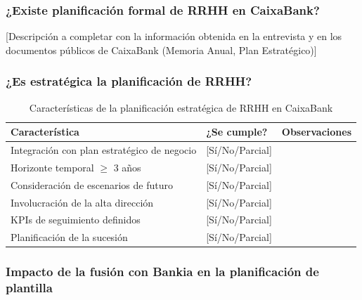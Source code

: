\subsubsection{¿Existe planificación formal de RRHH en CaixaBank?}

[Descripción a completar con la información obtenida en la entrevista
y en los documentos públicos de CaixaBank (Memoria Anual, Plan Estratégico)]

\subsubsection{¿Es estratégica la planificación de RRHH?}


\begin{table}[H]
  \centering
  \small
  \caption{Características de la planificación estratégica de RRHH en CaixaBank}
  \begin{tabularx}{\textwidth}{p{} p{} X}
    \toprule
    \textbf{Característica}                          & \textbf{¿Se cumple?} & \textbf{Observaciones} \\
    \midrule
    Integración con plan estratégico de negocio      & [Sí/No/Parcial] & \\
    Horizonte temporal $\geq$ 3 años                 & [Sí/No/Parcial] & \\
    Consideración de escenarios de futuro            & [Sí/No/Parcial] & \\
    Involucración de la alta dirección               & [Sí/No/Parcial] & \\
    KPIs de seguimiento definidos                    & [Sí/No/Parcial] & \\
    Planificación de la sucesión                     & [Sí/No/Parcial] & \\
    \bottomrule
  \end{tabularx}
\end{table}

\subsubsection{Impacto de la fusión con Bankia en la planificación de plantilla}

